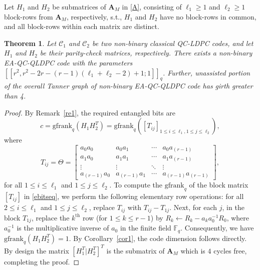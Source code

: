 \documentclass[conference]{IEEEtran}
\newtheorem{theorem}{Theorem}
\begin{document}
Let $H_1$ and $H_2$ be submatrices of $\mathbf{A}_M$ in \eqref{A}, consisting of $\ell_1\geq1$ and $\ell_2\geq1$ block-rows from $\mathbf{A}_M$, respectively, s.t., $H_1$ and $H_2$ have no block-rows in common, and all block-rows within each matrix are distinct.
\begin{theorem}\label{theorem3}
	Let $\mathcal{C}_{1}$ and $\mathcal{C}_{2}$ be two non-binary classical QC-LDPC codes, and let $H_{1}$ and $H_{2}$ be their parity-check matrices, respectively. There exists a non-binary EA-QC-QLDPC code with the parameters $[[r^{2}, r^{2}-2r-(r-1)(\ell_{1}+\ell_{2}-2)+1;1]]_q$. Further, unassisted portion of the overall  Tanner graph of non-binary EA-QC-QLDPC code has girth greater than 4.
\end{theorem}
\begin{proof} By Remark~\ref{re1}, the 
required entangled bits \cite{galindo2019entanglement} are 
\begin{equation}\label{ebitseq}
    c=\text{gfrank}_{q}(H_{1}H_{2}^{T})=
    \text{gfrank}_{q}([T_{ij}]_{1\leq i\leq \ell_{1}, 1\leq j\leq \ell_{2}}),
\end{equation}
where
\begin{equation*}
   T_{ij}=\Theta= \begin{bmatrix}
        a_{0}a_{0} & a_{0}a_{1} & \cdots & a_{0}a_{(r-1)}\\
        a_{1}a_{0} & a_{1}a_{1}& \cdots & a_{1}a_{(r-1)}\\
        \vdots & \vdots& \ddots & \vdots\\
        a_{(r-1)}a_{0} & a_{(r-1)}a_{1}& \cdots & a_{(r-1)}a_{(r-1)}
    \end{bmatrix},
\end{equation*}
for all $1\leq i\leq \ell_{1}$ and $1\leq j\leq \ell_{2}$.
To compute the $\mathrm{gfrank}_{q}$ of the block matrix $[T_{ij}]$ in \eqref{ebitseq}, we perform the following elementary row operations: for all $2 \leq i \leq \ell_1$ and $1\leq j\leq \ell_{2}$, replace $T_{ij}$ with $T_{ij} - T_{1j}$. Next, for each $j$, in the block $T_{1j}$, replace the $k^{\text{th}}$ row (for $1 \leq k \leq r-1$) by $R_k \leftarrow R_k - a_k a_0^{-1} R_0$, where $a_0^{-1}$ is the multiplicative inverse of $a_0$ in the finite field $\mathbb{F}_q$. Consequently, we have $\mathrm{gfrank}_{q}(H_1 H_2^T) = 1$. By Corollary~\ref{cor1}, the code dimension follows directly. By design the matrix $[H_{1}^{T}|H_{2}^{T}]^{T}$ is the submatrix of \( \mathbf{A}_M \) which is $4$ cycles free, completing the proof.
\end{proof}
\end{document}
